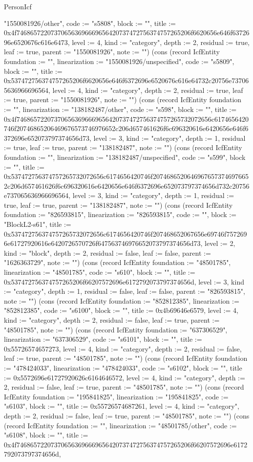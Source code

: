 \begin{lexlean}{PersonIcf}
\begin{semanticmodule}
{"1550081926/other", code := "s5808", block := "", title := 0x4f746865722073706563696669656420737472756374757265206f6620656e646f6372696e6520676c616e6473, level := 4, kind := "category", depth := 2, residual := true, leaf := true, parent := "1550081926", note := ""}) (cons (record IcfEntity {foundation := "", linearization := "1550081926/unspecified", code := "s5809", block := "", title := 0x537472756374757265206f6620656e646f6372696e6520676c616e64732c20756e737065636966696564, level := 4, kind := "category", depth := 2, residual := true, leaf := true, parent := "1550081926", note := ""}) (cons (record IcfEntity {foundation := "", linearization := "138182487/other", code := "s598", block := "", title := 0x4f746865722073706563696669656420737472756374757265732072656c6174656420746f20746865206469676573746976652c206d657461626f6c696320616e6420656e646f6372696e652073797374656d73, level := 3, kind := "category", depth := 1, residual := true, leaf := true, parent := "138182487", note := ""}) (cons (record IcfEntity {foundation := "", linearization := "138182487/unspecified", code := "s599", block := "", title := 0x537472756374757265732072656c6174656420746f20746865206469676573746976652c206d657461626f6c696320616e6420656e646f6372696e652073797374656d732c20756e737065636966696564, level := 3, kind := "category", depth := 1, residual := true, leaf := true, parent := "138182487", note := ""}) (cons (record IcfEntity {foundation := "826593815", linearization := "826593815", code := "", block := "BlockL2-s61", title := 0x537472756374757265732072656c6174656420746f207468652067656e69746f7572696e61727920616e6420726570726f647563746976652073797374656d73, level := 2, kind := "block", depth := 2, residual := false, leaf := false, parent := "1626363729", note := ""}) (cons (record IcfEntity {foundation := "48501785", linearization := "48501785", code := "s610", block := "", title := 0x537472756374757265206f66207572696e6172792073797374656d, level := 3, kind := "category", depth := 1, residual := false, leaf := false, parent := "826593815", note := ""}) (cons (record IcfEntity {foundation := "852812385", linearization := "852812385", code := "s6100", block := "", title := 0x4b69646e6579, level := 4, kind := "category", depth := 2, residual := false, leaf := true, parent := "48501785", note := ""}) (cons (record IcfEntity {foundation := "637306529", linearization := "637306529", code := "s6101", block := "", title := 0x55726574657273, level := 4, kind := "category", depth := 2, residual := false, leaf := true, parent := "48501785", note := ""}) (cons (record IcfEntity {foundation := "478424033", linearization := "478424033", code := "s6102", block := "", title := 0x5572696e61727920626c6164646572, level := 4, kind := "category", depth := 2, residual := false, leaf := true, parent := "48501785", note := ""}) (cons (record IcfEntity {foundation := "195841825", linearization := "195841825", code := "s6103", block := "", title := 0x55726574687261, level := 4, kind := "category", depth := 2, residual := false, leaf := true, parent := "48501785", note := ""}) (cons (record IcfEntity {foundation := "", linearization := "48501785/other", code := "s6108", block := "", title := 0x4f746865722073706563696669656420737472756374757265206f66207572696e6172792073797374656d, }
\end{semanticmodule}
\end{lexlean}
